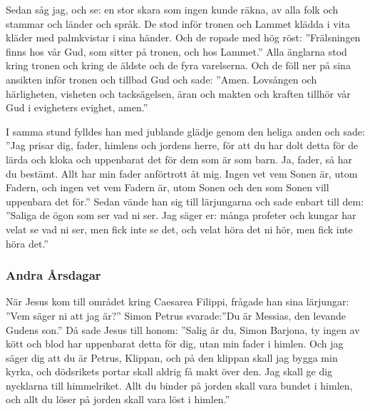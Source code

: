 
Sedan såg jag, och se: en stor skara som ingen kunde räkna, av alla folk och stammar och länder och språk. De stod inför tronen och Lammet klädda i vita kläder med palmkvistar i sina händer.
Och de ropade med hög röst: ”Frälsningen finns hos vår Gud, som sitter på tronen, och hos Lammet.”
Alla änglarna stod kring tronen och kring de äldste och de fyra varelserna. Och de föll ner på sina ansikten inför tronen och tillbad Gud
och sade: ”Amen. Lovsången och härligheten, visheten och tacksägelsen, äran och makten och kraften tillhör vår Gud i evigheters evighet, amen.”



I samma stund fylldes han med jublande glädje genom den heliga anden och sade: ”Jag prisar dig, fader, himlens och jordens herre, för att du har dolt detta för de lärda och kloka och uppenbarat det för dem som är som barn. Ja, fader, så har du bestämt.
Allt har min fader anförtrott åt mig. Ingen vet vem Sonen är, utom Fadern, och ingen vet vem Fadern är, utom Sonen och den som Sonen vill uppenbara det för.”
Sedan vände han sig till lärjungarna och sade enbart till dem: ”Saliga de ögon som ser vad ni ser.
Jag säger er: många profeter och kungar har velat se vad ni ser, men fick inte se det, och velat höra det ni hör, men fick inte höra det.”



\subsubsection{Andra Årsdagar}




När Jesus kom till området kring Caesarea Filippi, frågade han sina lärjungar:
”Vem säger ni att jag är?”
Simon Petrus svarade:”Du är Messias, den levande Gudens son.”
Då sade Jesus till honom: ”Salig är du, Simon Barjona, ty ingen av kött och blod har uppenbarat detta för dig, utan min fader i himlen.
Och jag säger dig att du är Petrus, Klippan, och på den klippan skall jag bygga min kyrka, och dödsrikets portar skall aldrig få makt över den.
Jag skall ge dig nycklarna till himmelriket. Allt du binder på jorden skall vara bundet i himlen, och allt du löser på jorden skall vara löst i himlen.”


